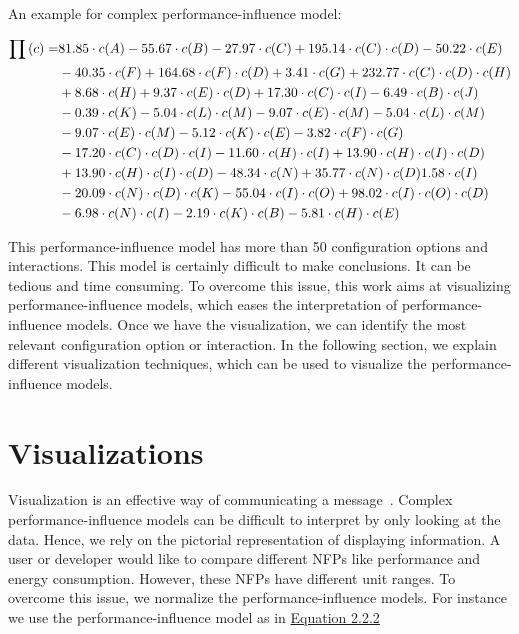 An example for complex performance-influence model:

\begin{align}
\prod {(c)}  = &81.85 \cdot c(A) - 55.67 \cdot c(B) - 27.97 \cdot
    c(C)+195.14\cdot c(C)\cdot c(D) - 50.22 \cdot c(E) \notag\\
    &- 40.35 \cdot c(F) + 164.68 \cdot c(F) \cdot c(D) +  3.41 \cdot c(G) + 232.77 \cdot c(C)  \cdot c(D) \cdot c(H) \notag\\
    &+ 8.68 \cdot c(H) + 9.37 \cdot c(E) \cdot c(D) + 17.30 \cdot c(C) \cdot c(I)  - 6.49 \cdot c(B) \cdot c(J)\notag\\
    & - 0.39 \cdot c(K) - 5.04 \cdot c(L) \cdot c(M) - 9.07 \cdot c(E) \cdot c(M) - 5.04 \cdot c(L) \cdot c(M)\notag\\
    &- 9.07 \cdot c(E) \cdot c(M) -5.12 \cdot c(K) \cdot c(E) - 3.82 \cdot c(F) \cdot c(G)\notag\\
    &- 17.20 \cdot c(C) \cdot c(D) \cdot c(I) - 11.60 \cdot c(H) \cdot c(I) + 13.90 \cdot c(H) \cdot c(I) \cdot c(D) \notag\\
    &+ 13.90 \cdot c(H) \cdot c(I) \cdot c(D) - 48.34 \cdot c(N) + 35.77 \cdot c(N) \cdot c(D)  1.58 \cdot c(I) \notag\\
    &- 20.09 \cdot c(N) \cdot c(D) \cdot c(K) - 55.04 \cdot c(I) \cdot c(O) + 98.02 \cdot c(I) \cdot c(O) \cdot c(D)\notag\\
    & - 6.98 \cdot c(N) \cdot c(I) - 2.19 \cdot c(K) \cdot c(B) - 5.81 \cdot c(H) \cdot c(E) \notag
\end{align}

This performance-influence model has more than 50 configuration options and interactions. This model is certainly difficult to make conclusions. It can be tedious and time consuming. To overcome this issue, this work aims at visualizing performance-influence models, which eases the interpretation of performance-influence models. Once we have the visualization, we can identify the most relevant configuration option or interaction. In the following section, we explain different visualization techniques, which can be used to visualize the performance-influence models.

\section{Visualizations}
\label{sec:2.3}
Visualization is an effective way of communicating a message~\cite{DBLP:conf/vissym/IsaacsGJGB0HB14}. Complex performance-influence models can be difficult to interpret by only looking at the data. Hence, we rely on the pictorial representation of displaying information. A user or developer would like to compare different NFPs like performance and energy consumption. However, these NFPs have different unit ranges. To overcome this issue, we normalize the performance-influence models.
For instance we use the performance-influence model as in \hyperref[eq:2.2.2]{Equation 2.2.2}

